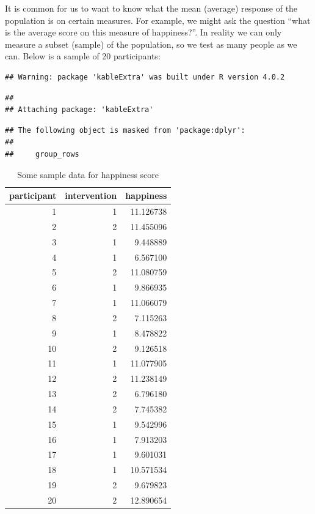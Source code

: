 \documentclass[
]{book}
\begin{document}
It is common for us to want to know what the mean (average) response of the population is on certain measures. For example, we might ask the question ``what is the average score on this measure of happiness?''. In reality we can only measure a subset (sample) of the population, so we test as many people as we can. Below is a sample of 20 participants:

\begin{verbatim}
## Warning: package 'kableExtra' was built under R version 4.0.2
\end{verbatim}

\begin{verbatim}
## 
## Attaching package: 'kableExtra'
\end{verbatim}

\begin{verbatim}
## The following object is masked from 'package:dplyr':
## 
##     group_rows
\end{verbatim}

\begin{table}

\caption{\label{tab:unnamed-chunk-2}Some sample data for happiness score}
\centering
\begin{tabular}[t]{r|r|r}
\hline
participant & intervention & happiness\\
\hline
1 & 1 & 11.126738\\
\hline
2 & 2 & 11.455096\\
\hline
3 & 1 & 9.448889\\
\hline
4 & 1 & 6.567100\\
\hline
5 & 2 & 11.080759\\
\hline
6 & 1 & 9.866935\\
\hline
7 & 1 & 11.066079\\
\hline
8 & 2 & 7.115263\\
\hline
9 & 1 & 8.478822\\
\hline
10 & 2 & 9.126518\\
\hline
11 & 1 & 11.077905\\
\hline
12 & 2 & 11.238149\\
\hline
13 & 2 & 6.796180\\
\hline
14 & 2 & 7.745382\\
\hline
15 & 1 & 9.542996\\
\hline
16 & 1 & 7.913203\\
\hline
17 & 1 & 9.601031\\
\hline
18 & 1 & 10.571534\\
\hline
19 & 2 & 9.679823\\
\hline
20 & 2 & 12.890654\\
\hline
\end{tabular}
\end{table}
\end{document}
